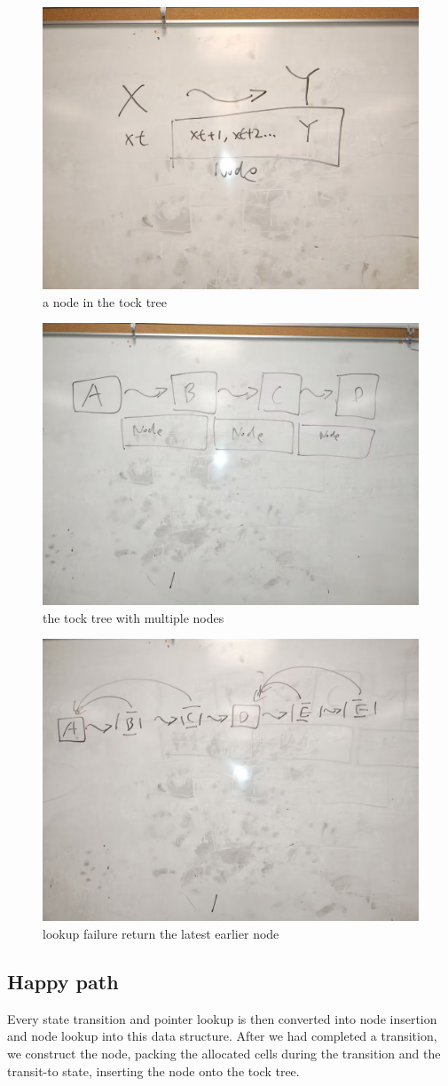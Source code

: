 \begin{figure}
	\includegraphics[width=0.5\columnwidth]{2}
	\caption{a node in the tock tree}
\end{figure}
\begin{figure}
	\includegraphics[width=0.5\columnwidth]{3}
	\caption{the tock tree with multiple nodes}
\end{figure}

\begin{figure}
	\includegraphics[width=0.5\columnwidth]{4}
	\caption{lookup failure return the latest earlier node}
\end{figure}

\subsection{Happy path}
Every state transition and pointer lookup is then converted into node insertion and node lookup into this data structure. After we had completed a transition, we construct the node, packing the allocated cells during the transition and the transit-to state, inserting the node onto the tock tree.

